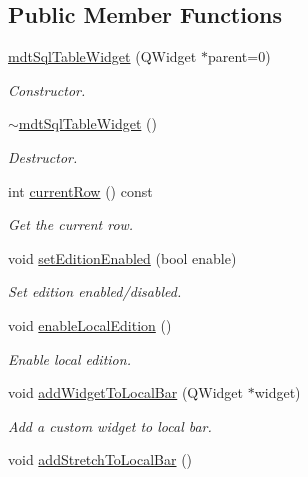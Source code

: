 \subsection*{Public Member Functions}
\begin{DoxyCompactItemize}
\item 
\hyperlink{classmdt_sql_table_widget_a4cf2b0d69608e88d33996148f612e58d}{mdtSqlTableWidget} (QWidget $\ast$parent=0)
\begin{DoxyCompactList}\small\item\em Constructor. \end{DoxyCompactList}\item 
\hypertarget{classmdt_sql_table_widget_ab5db8a20c64340bba4841a1b1c928d7f}{
\hyperlink{classmdt_sql_table_widget_ab5db8a20c64340bba4841a1b1c928d7f}{$\sim$mdtSqlTableWidget} ()}
\label{classmdt_sql_table_widget_ab5db8a20c64340bba4841a1b1c928d7f}

\begin{DoxyCompactList}\small\item\em Destructor. \end{DoxyCompactList}\item 
\hypertarget{classmdt_sql_table_widget_a7612cf9cb10c69365b7ed820d71e6cb2}{
int \hyperlink{classmdt_sql_table_widget_a7612cf9cb10c69365b7ed820d71e6cb2}{currentRow} () const }
\label{classmdt_sql_table_widget_a7612cf9cb10c69365b7ed820d71e6cb2}

\begin{DoxyCompactList}\small\item\em Get the current row. \end{DoxyCompactList}\item 
void \hyperlink{classmdt_sql_table_widget_af5ef66b8ebb45a698f99ad455208f3c8}{setEditionEnabled} (bool enable)
\begin{DoxyCompactList}\small\item\em Set edition enabled/disabled. \end{DoxyCompactList}\item 
void \hyperlink{classmdt_sql_table_widget_a39422fb9522ee73513f13d8bcb91a143}{enableLocalEdition} ()
\begin{DoxyCompactList}\small\item\em Enable local edition. \end{DoxyCompactList}\item 
void \hyperlink{classmdt_sql_table_widget_a9c0ae7b87d1840f2fdcee6de763fe31a}{addWidgetToLocalBar} (QWidget $\ast$widget)
\begin{DoxyCompactList}\small\item\em Add a custom widget to local bar. \end{DoxyCompactList}\item 
\hypertarget{classmdt_sql_table_widget_a6cf9f08b98dd3df16d36c29db7175633}{
void \hyperlink{classmdt_sql_table_widget_a6cf9f08b98dd3df16d36c29db7175633}{addStretchToLocalBar} ()}
\label{classmdt_sql_table_widget_a6cf9f08b98dd3df16d36c29db7175633}


\end{DoxyCompactItemize}
